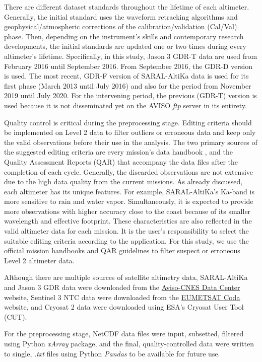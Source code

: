 There are different dataset standards throughout the lifetime of each altimeter. Generally, the initial standard uses the waveform retracking algorithms and geophysical/atmospheric corrections of the calibration/validation (Cal/Val) phase. Then, depending on the instrument's skills and contemporary research developments, the initial standards are updated one or two times during every altimeter's lifetime. Specifically, in this study, Jason 3 GDR-T data are used from February 2016 until September 2016. From September 2016, the GDR-D version is used. The most recent, GDR-F version of SARAL-AltiKa data is used for its first phase (March 2013 until July 2016) and also for the period from November 2019 until July 2020. For the intervening period, the previous (GDR-T) version is used because it is not disseminated yet on the AVISO \emph{ftp} server in its entirety.

Quality control is critical during the preprocessing stage. Editing criteria should be implemented on Level 2 data to filter outliers or erroneous data and keep only the valid observations before their use in the analysis. The two primary sources of the suggested editing criteria are every mission's data handbook \cite{Bronner2013, ESA2019, EUMETSAT2017, Mertz2017, Jason32018}, and the Quality Assessment Reports (QAR) that accompany the data files after the completion of each cycle. Generally, the discarded observations are not extensive due to the high data quality from the current missions. As already discussed, each altimeter has its unique features. For example, SARAL-AltiKa’s Ka-band is more sensitive to rain and water vapor. Simultaneously, it is expected to provide more observations with higher accuracy close to the coast because of its smaller wavelength and effective footprint. These characteristics are also reflected in the valid altimeter data for each mission. It is the user's responsibility to select the suitable editing criteria according to the application. For this study, we use the official mission handbooks and QAR guidelines to filter suspect or erroneous Level 2 altimeter data.

Although there are multiple sources of satellite altimetry data, SARAL-AltiKa and Jason 3 GDR data were downloaded from the \href{https://aviso-data-center.cnes.fr/}{Aviso-CNES Data Center} website, Sentinel 3 NTC data were downloaded from the \href{https://coda.eumetsat.int/#/home}{EUMETSAT Coda} website, and Cryosat 2 data were downloaded using ESA’s Cryosat User Tool (CUT).

For the preprocessing stage, NetCDF data files were input, subsetted, filtered using Python \emph{xArray} \cite{Hoyer2017} package, and the final, quality-controlled data were written to single, \emph{.txt} files using Python \emph{Pandas} \cite{McKinney2010} to be available for future use.


